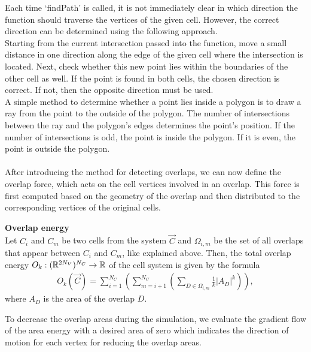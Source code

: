 Each time `findPath' is called, it is not immediately clear in which direction the function should traverse the vertices of the given cell. 
However, the correct direction can be determined using the following approach. \\
Starting from the current intersection passed into the function, move a small distance in one direction along the edge of the given cell where the intersection is located. Next, check whether this new point lies within the boundaries of the other cell as well. 
If the point is found in both cells, the chosen direction is correct. 
If not, then the opposite direction must be used. \\ 
A simple method to determine whether a point lies inside a polygon is to draw a ray from the point to the outside of the polygon. 
The number of intersections between the ray and the polygon's edges determines the point's position. 
If the number of intersections is odd, the point is inside the polygon.
If it is even, the point is outside the polygon. \\ 
\smallskip  \\
After introducing the method for detecting overlaps, we can now define the overlap force, which acts on the cell vertices involved in an overlap. 
This force is first computed based on the geometry of the overlap and then distributed to the corresponding vertices of the original cells. 

\begin{definition} \textbf{Overlap energy} \\
	Let $C_i$ and $C_m$ be two cells from the system $\vec{C}$ and $\Omega_{i,m}$ be the set of all overlaps that appear between $C_i$ and $C_m$, like explained above. Then, the total overlap energy $O_k : (\mathbb{R}^{2N_V})^{N_C} \rightarrow \mathbb{R}$ of the cell system is given by the formula 
	\begin{align}
		O_k(\vec{C}) = \sum\limits_{i=1}^{N_C} \left( \sum\limits_{m=i+1}^{N_C} \left(\sum\limits_{D \in \Omega_{i,m}} \frac{1}{k}|A_{D}|^k\right) \right),		
	\end{align} 
	where $A_{D}$ is the area of the overlap $D$.  \\
\end{definition}

To decrease the overlap areas during the simulation, we evaluate the gradient flow of the area energy with a desired area of zero which indicates the direction of motion for each vertex for reducing the overlap areas.

